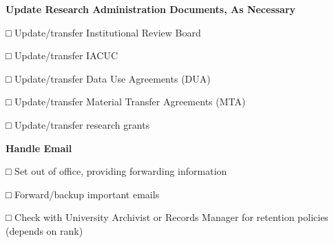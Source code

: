 \documentclass[
]{book}
\begin{document}
\textbf{Update Research Administration Documents, As Necessary}

□ Update/transfer Institutional Review Board

□ Update/transfer IACUC

□ Update/transfer Data Use Agreements (DUA)

□ Update/transfer Material Transfer Agreements (MTA)

□ Update/transfer research grants

\textbf{Handle Email}

□ Set out of office, providing forwarding information

□ Forward/backup important emails

□ Check with University Archivist or Records Manager for retention policies (depends on rank)

  
\end{document}

